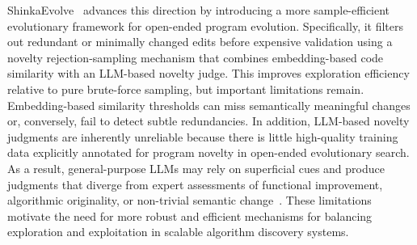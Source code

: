 ShinkaEvolve~\citep{lange2025shinkaevolve} advances this direction by introducing a more sample-efficient evolutionary framework for open-ended program evolution. Specifically, it filters out redundant or minimally changed edits before expensive validation using a novelty rejection-sampling mechanism that combines embedding-based code similarity with an LLM-based novelty judge. This improves exploration efficiency relative to pure brute-force sampling, but important limitations remain. Embedding-based similarity thresholds can miss semantically meaningful changes or, conversely, fail to detect subtle redundancies. In addition, LLM-based novelty judgments are inherently unreliable because there is little high-quality training data explicitly annotated for program novelty in open-ended evolutionary search. As a result, general-purpose LLMs may rely on superficial cues and produce judgments that diverge from expert assessments of functional improvement, algorithmic originality, or non-trivial semantic change~\citep{zheng2023judging, szymanski2025limitations, lin2025evaluating}. These limitations motivate the need for more robust and efficient mechanisms for balancing exploration and exploitation in scalable algorithm discovery systems.

